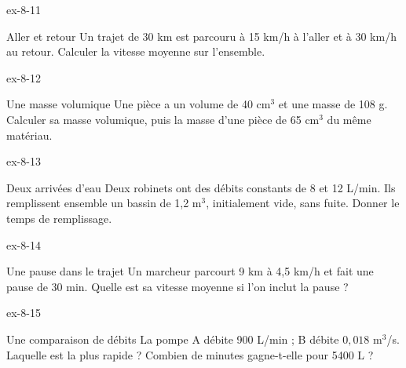 \begin{blocLivre}{ex-8-11}\begin{exercice}[3]{Aller et retour}
Un trajet de 30 km est parcouru à 15 km/h à l’aller et à 30 km/h au retour. Calculer la vitesse moyenne sur l’ensemble.
\end{exercice}\end{blocLivre}
\begin{blocLivre}{ex-8-12}\begin{exercice}[3]{Une masse volumique}
Une pièce a un volume de 40 cm$^3$ et une masse de 108 g. Calculer sa masse volumique, puis la masse d’une pièce de 65 cm$^3$ du même matériau.
\end{exercice}\end{blocLivre}
\begin{blocLivre}{ex-8-13}\begin{exercice}[3]{Deux arrivées d’eau}
Deux robinets ont des débits constants de 8 et 12 L/min. Ils remplissent ensemble un bassin de 1,2 m$^3$, initialement vide, sans fuite. Donner le temps de remplissage.
\end{exercice}\end{blocLivre}
\begin{blocLivre}{ex-8-14}\begin{exercice}[3]{Une pause dans le trajet}
Un marcheur parcourt 9 km à 4,5 km/h et fait une pause de 30 min. Quelle est sa vitesse moyenne si l’on inclut la pause ?
\end{exercice}\end{blocLivre}
\begin{blocLivre}{ex-8-15}\begin{exercice}[3]{Une comparaison de débits}
La pompe A débite 900 L/min ; B débite $0{,}018$ m$^3$/s. Laquelle est la plus rapide ? Combien de minutes gagne-t-elle pour 5400 L ?
\end{exercice}\end{blocLivre}

\clearpage

